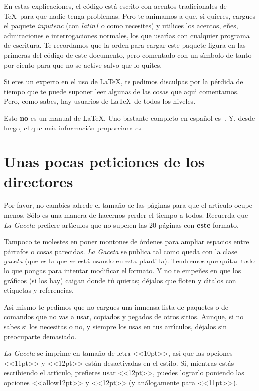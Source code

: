 \documentclass[autocontact]{gaceta}
\begin{document}
En estas explicaciones, el c\'odigo est\'a escrito con acentos tradicionales de \TeX\ para que nadie tenga problemas. Pero te animamos a que, si quieres, cargues el paquete \textit{inputenc} (con \textit{latin1} o como necesites) y utilices los acentos, e\~nes, admiraciones e interrogaciones normales, los que usar\'{\i}as con cualquier programa de escritura. Te recordamos que la orden para cargar este paquete figura en las primeras del c\'odigo de este documento, pero comentado con un s\'{\i}mbolo de tanto por ciento para que no se active salvo que lo quites.

Si eres un experto en el uso de \LaTeX, te pedimos disculpas por la p\'erdida de tiempo que te puede suponer leer algunas de las cosas que aqu\'{\i} comentamos. Pero, como sabes, hay usuarios de \LaTeX\ de todos los niveles.

Esto \textbf{no} es un manual de \LaTeX. Uno bastante completo en espa\~nol es~\cite{latex-imprenta}. Y, desde luego, el que m\'as informaci\'on proporciona es~\cite{latex-companion}.

\section{Unas pocas peticiones de los directores}

Por favor, no cambies adrede el tama\~no de las p\'aginas para que el art\'{\i}culo ocupe menos. S\'olo es una manera de hacernos perder el tiempo a todos. Recuerda que \textit{La Gaceta} prefiere art\'{\i}culos que no superen las 20 p\'aginas con \textbf{este} formato.

Tampoco te molestes en poner montones de \'ordenes para ampliar espacios entre p\'arrafos o cosas parecidas. \textit{La Gaceta} se publica tal como queda con la clase \textit{gaceta} (que es la que se est\'a usando en esta plantilla). Tendremos que quitar todo lo que pongas para intentar modificar el formato. Y no te empe\~nes en que los gr\'aficos (si los hay) caigan donde t\'u quieras; d\'ejalos que floten y c\'{\i}talos con etiquetas y referencias.

As\'{\i} mismo te pedimos que no cargues una inmensa lista de paquetes o de comandos que no vas a usar, copiados y pegados de otros sitios. Aunque, si no sabes si los necesitas o no, y siempre los usas en tus art\'{\i}culos, d\'ejalos sin preocuparte demasiado.

\textit{La Gaceta} se imprime en tama\~no de letra <<10pt>>, as\'{\i} que las opciones <<11pt>> y <<12pt>> est\'an desactivadas en el estilo. Si, mientras est\'as escribiendo el art\'{\i}culo, prefieres usar <<12pt>>, puedes lograrlo poniendo las opciones <<allow12pt>> y <<12pt>> (y an\'alogamente para <<11pt>>).
\end{document}
